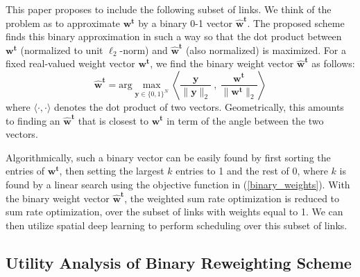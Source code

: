\documentclass[journal,12pt,onecolumn,draftclsnofoot,]{IEEEtran}
\begin{document}
This paper proposes to include the following subset of links. We think of the
problem as to approximate $\mathbf{w^t}$ by a binary 0-1 vector
$\mathbf{\hat{w}^t}$.  The proposed scheme finds this binary approximation in
such a way so that the dot product between $\mathbf{w^t}$ (normalized to 
unit $\ell_2$-norm) and $\mathbf{\hat{w}^t}$ (also normalized) is maximized.
For a fixed real-valued weight vector $\mathbf{w^t}$, we find the binary
weight vector $\mathbf{\hat{w}^t}$ as follows:
\begin{equation}
\mathbf{\hat{w}^t} = \displaystyle \mathrm{arg}\max_{\mathbf{y} \in \{0,1\}^N} 
\left\langle \frac{\mathbf{y}}{\|\mathbf{y}\|_2} \ , \
\frac{\mathbf{w^t}}{\|\mathbf{w^t}\|_2}  \right\rangle 
\label{binary_weights}
\end{equation}
where $\langle \cdot , \cdot \rangle$ denotes the dot product of two vectors.
Geometrically, this amounts to finding an $\mathbf{\hat{w}^t}$ that is
closest to $\mathbf{w^t}$ in term of the angle between the two vectors.  

Algorithmically, such a binary vector can be easily found by
first sorting the entries of $\mathbf{w^t}$, then setting the largest $k$
entries to 1 and the rest of 0, where $k$ is found by a linear search using the
objective function in (\ref{binary_weights}). 
With the binary weight vector $\mathbf{\hat{w}^t}$, the weighted sum rate
optimization is reduced to sum rate optimization, over the subset
of links with weights equal to 1. We can then utilize spatial deep learning to perform
scheduling over this subset of links. 

\subsection{Utility Analysis of Binary Reweighting Scheme}
\label{sec:binaryWeightsAnalysis}
\end{document}
